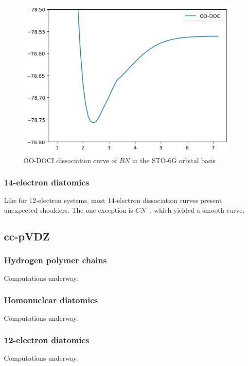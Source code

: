 \documentclass[twoside,twocolumn,9pt]{article}
\begin{document}
\begin{figure}[h]
  \includegraphics[width=\linewidth]{BN.png}
  \caption{OO-DOCI dissociation curve of $BN$ in the STO-6G orbital basis}\label{BN_bad}
\end{figure}


\subsubsection{14-electron diatomics}

Like for 12-electron systems, most 14-electron dissociation curves present unexpected shoulders. The one exception is $CN^-$, which yielded a smooth curve.


\subsection{cc-pVDZ}
\subsubsection{Hydrogen polymer chains}
Computations underway.

\subsubsection{Homonuclear diatomics}
Computations underway.

\subsubsection{12-electron diatomics}
Computations underway.
\end{document}
